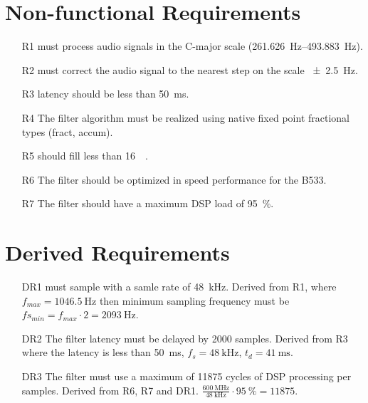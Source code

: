 \section{Non-functional Requirements}
\label{sec:nonfunc}
\begin{itemize}
	\item[R1] \systemName must process audio signals in the C-major scale (\SIrange{261.626}{493.883}{\hertz}).
	\item[R2] \systemName must correct the audio signal to the nearest step on the scale \SI{\pm 2.5}{\hertz}.
	\item[R3] \systemName latency should be less than \SI{50}{\milli\second}.
	\item[R4] The filter algorithm must be realized using native fixed point fractional types (fract, accum).
	\item[R5] \systemName should fill less than \SI{16}{\kilo\byte}.
	\item[R6] The filter should be optimized in speed performance for the B533.
	\item[R7] The filter should have a maximum DSP load of \SI{95}{\percent}.
\end{itemize}

\section{Derived Requirements}
\begin{itemize}
	\item[DR1] \systemName must sample with a samle rate of \SI{48}{\kilo\hertz}.
	Derived from R1, where $f_{max}=\SI{1046.5}{\hertz}$ then minimum sampling frequency must be $fs_{min} = f_{max}\cdot 2 = \SI{2093}{\hertz}$.
	\item[DR2] The filter latency must be delayed by \num{2000} samples.
	Derived from R3 where the latency is less than \SI{50}{\milli\second}, $f_s = \SI{48}{\kilo\hertz}$, $t_d = \SI{41}{\milli\second}$.
	\item[DR3] The filter must use a maximum of \num{11875} cycles of DSP processing per samples. Derived from R6, R7 and DR1.
	$\frac{\SI{600}{\mega\hertz}}{\SI{48}{\kilo\hertz}}\cdot\SI{95}{\percent} = \num{11875}$.
\end{itemize}

